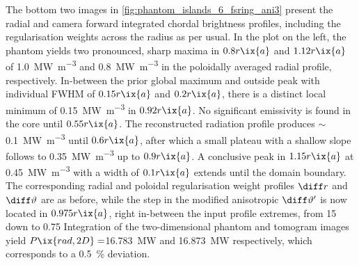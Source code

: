             The bottom two images in \cref{fig:phantom_islands_6_fsring_ani3} present the radial and camera forward integrated chordal brightness profiles, including the regularisation weights across the radius as per usual. In the plot on the left, the phantom yields two pronounced, sharp maxima in $0.8r\ix{a}$ and $1.12r\ix{a}$ of \SI{1.0}{\mega\watt\per\cubic\meter} and \SI{0.8}{\mega\watt\per\cubic\meter} in the poloidally averaged radial profile, respectively. In-between the prior global maximum and outside peak with individual FWHM of $0.15r\ix{a}$ and $0.2r\ix{a}$, there is a distinct local minimum of \SI{0.15}{\mega\watt\per\cubic\meter} in $0.92r\ix{a}$. No significant emissivity is found in the core until $0.55r\ix{a}$. The reconstructed radiation profile produces $\sim$\SI{0.1}{\mega\watt\per\cubic\meter} until $0.6r\ix{a}$, after which a small plateau with a shallow slope follows to \SI{0.35}{\mega\watt\per\cubic\meter} up to $0.9r\ix{a}$. A conclusive peak in $1.15r\ix{a}$ at \SI{0.45}{\mega\watt\per\cubic\meter} with a width of $0.1r\ix{a}$ extends until the domain boundary. The corresponding radial and poloidal regularisation weight profiles $\diff r$ and $\diff\vartheta$ are as before, while the step in the modified anisotropic $\diff\vartheta^{\prime}$ is now located in $0.975r\ix{a}$, right in-between the input profile extremes, from \SI{15}{\arbitraryunit} down to \SI{0.75}{\arbitraryunit} Integration of the two-dimensional phantom and tomogram images yield $P\ix{rad,2D}=$\SI{16.783}{\mega\watt} and \SI{16.873}{\mega\watt} respectively, which corresponds to a \SI{0.5}{\percent} deviation.\\%
